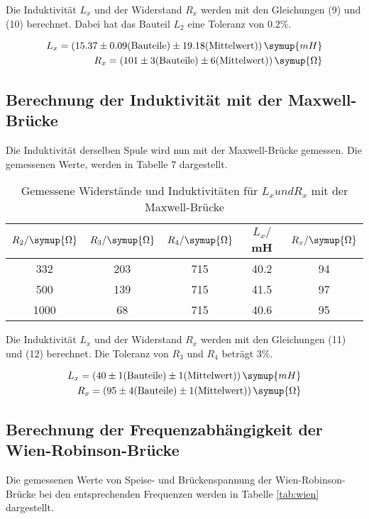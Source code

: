 Die Induktivität $L_{x}$ und der Widerstand $R_{x}$ werden mit den Gleichungen (9) und (10) berechnet. Dabei hat
das Bauteil $L_2$ eine Toleranz von $0.2\%$.

\begin{align*}
  L_{x} = (15.37 \pm 0.09\text{(Bauteile)} \pm 19.18\text{(Mittelwert)}) \, \symup{mH} \\
  R_x = (101 \pm 3\text{(Bauteile)} \pm 6\text{(Mittelwert)}) \, \symup{\Omega}
\end{align*}


\subsection{Berechnung der Induktivität mit der Maxwell-Brücke}
Die Induktivität derselben Spule wird nun mit der Maxwell-Brücke gemessen. Die gemessenen Werte, werden in Tabelle 7
dargestellt.

\begin{table}[H]
  \centering
  \caption{Gemessene Widerstände und Induktivitäten für $L_{x} und R_{x}$ mit der Maxwell-Brücke}
  \label{tab:Widerstand}
  \begin{tabular}{c c c c c}
    \toprule
     $R_2/ \symup{\Omega}$ & $R_3/ \symup{\Omega}$ & $R_4 / \symup{\Omega}$ & $L_x/$mH & $R_x/\symup{\Omega}$\\
    \midrule
    332 & 203 & 715 & 40.2 & 94 \\
    500 & 139 & 715 & 41.5 & 97 \\
   1000 &  68 & 715 & 40.6 & 95 \\
    \bottomrule
  \end{tabular}
\end{table}

Die Induktivität $L_{x}$ und der Widerstand $R_{x}$ werden mit den Gleichungen (11) und (12) berechnet. Die
Toleranz von $R_3$ und $R_4$ beträgt $3\%$.

\begin{align*}
  L_x = (40 \pm 1\text{(Bauteile)} \pm 1 \text{(Mittelwert)})  \, \symup{mH} \\
  R_x = (95 \pm 4\text{(Bauteile)} \pm 1\text{(Mittelwert)})   \, \symup{\Omega}
\end{align*}




\subsection{Berechnung der Frequenzabhängigkeit der Wien-Robinson-Brücke}
Die gemessenen Werte von Speise- und Brückenspannung der Wien-Robinson-Brücke bei
den entsprechenden Frequenzen werden in Tabelle \ref{tab:wien} dargestellt.

